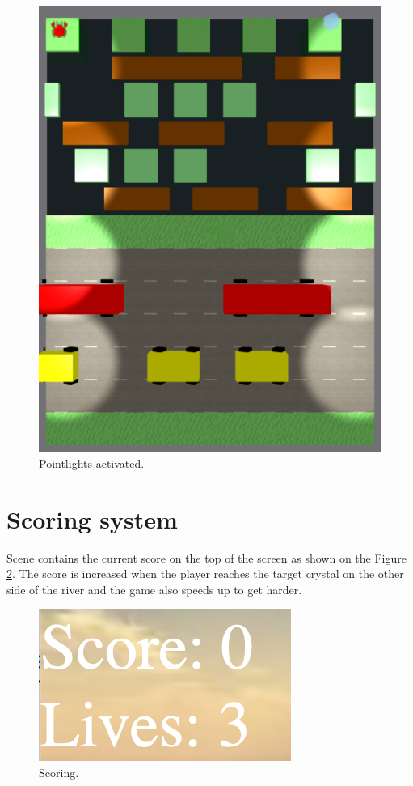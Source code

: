 \documentclass[a4paper,10pt, twocolumn]{article}
\begin{document}
\begin{figure}[!htb]
	\centering
 	\includegraphics[width=\linewidth]{images/pointlights.png}
  	\caption{Pointlights activated.}
	\label{pointlights}
\end{figure}

\section{Scoring system}
Scene contains the current score on the top of the screen as shown on the Figure \ref{score}. The score is increased when the player reaches the target crystal on the other side of the river and the game also speeds up to get harder.

\begin{figure}[!htb]
	\centering
 	\includegraphics[width=0.5\linewidth]{images/score.png}
  	\caption{Scoring.}
	\label{score}
\end{figure}
\end{document}
